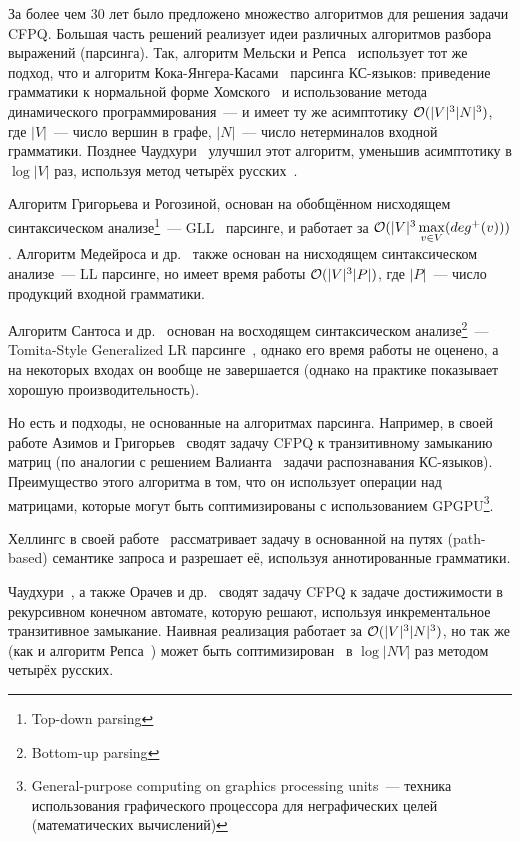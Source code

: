 За более чем 30 лет было предложено множество алгоритмов для решения задачи CFPQ.
Большая часть решений реализует идеи различных алгоритмов разбора выражений (парсинга). Так, алгоритм Мельски и Репса~\cite{Reps97} использует тот же подход, что и алгоритм Кока-Янгера-Касами~\cite{Younger1967} парсинга КС-языков: приведение грамматики к нормальной форме Хомского~\cite{Chomsky1957} и использование метода динамического программирования~--- и имеет ту же асимптотику $\mathcal{O}(|V|^3 |N|^3)$, где $|V|$~--- число вершин в графе, $|N|$~--- число нетерминалов входной грамматики. Позднее Чаудхури~\cite{Chaudhuri06} улучшил этот алгоритм, уменьшив асимптотику в $\log |V|$ раз, используя метод четырёх русских~\cite{Arlazarov70}.

Алгоритм Григорьева и Рогозиной, основан на обобщённом нисходящем синтаксическом анализе\footnote{Top-down parsing}~--- GLL~\cite{Scott10} парсинге, и работает за $\mathcal{O}(|V|^3 \max\limits_{v \in V} (deg^{+}(v)))$. Алгоритм Медейроса и др.~\cite{Medeiros18} также основан на нисходящем синтаксическом анализе~--- LL парсинге, но имеет время работы $\mathcal{O}(|V|^3 |P|)$, где $|P|$~--- число продукций входной грамматики.

Алгоритм Сантоса и др.~\cite{Santos18} основан на восходящем синтаксическом анализе\footnote{Bottom-up parsing}~--- Tomita-Style Generalized LR парсинге~\cite{Scott00}, однако его время работы не оценено, а на некоторых входах он вообще не завершается (однако на практике показывает хорошую производительность). 

Но есть и подходы, не основанные на алгоритмах парсинга. 
Например, в своей работе Азимов и Григорьев~\cite{Santos18} сводят задачу CFPQ к транзитивному замыканию матриц (по аналогии с решением Валианта~\cite{Valiant1975} задачи распознавания КС-языков). Преимущество этого алгоритма в том, что он использует операции над матрицами, которые могут быть соптимизированы с использованием GPGPU\footnote{General-purpose computing on graphics processing units~--- техника использования графического процессора для неграфических целей (математических вычислений)}.

Хеллингс в своей работе~\cite{Hellings15} рассматривает задачу в основанной на путях (path-based) семантике запроса и разрешает её, используя аннотированные грамматики.

Чаудхури~\cite{Chaudhuri08}, а также Орачев и др.~\cite{Orachev20} сводят задачу CFPQ к задаче достижимости в рекурсивном конечном автомате, которую решают, используя инкрементальное транзитивное замыкание. Наивная реализация работает за $\mathcal{O}(|V|^3 |N|^3)$, но так же (как и алгоритм Репса~\cite{Reps97,Chaudhuri06}) может быть соптимизирован~\cite{Shemetova21} в $\log |NV|$ раз методом четырёх русских.

